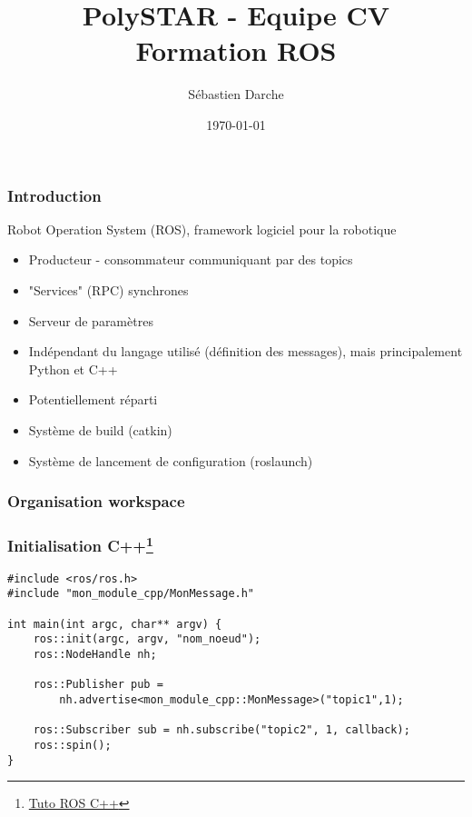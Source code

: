 \documentclass{beamer}
\title{PolySTAR - Equipe CV\\Formation ROS}
\author{Sébastien Darche}
\institute{PolySTAR - Polytechnique Montréal}
\date{\today}
\begin{document}
\frame{\titlepage}


\begin{frame}
\frametitle{Introduction}

Robot Operation System (ROS), framework logiciel pour la robotique

\begin{itemize}
    \item Producteur - consommateur communiquant par des topics
    \item "Services" (RPC) synchrones
    \item Serveur de paramètres
    \item Indépendant du langage utilisé (définition des messages), mais principalement Python et C++
    \item Potentiellement réparti
    \item Système de build (catkin)
    \item Système de lancement de configuration (roslaunch)
\end{itemize}

\end{frame}


\begin{frame}
\frametitle{Organisation workspace}
\footnotesize{
}
\end{frame}

\begin{frame}[fragile]
\frametitle{Initialisation
C++\footnote{\href{http://wiki.ros.org/ROS/Tutorials/WritingPublisherSubscriber\%28c\%2B\%2B\%29
}{Tuto ROS C++}}
}
\begin{verbatim}
#include <ros/ros.h>
#include "mon_module_cpp/MonMessage.h"

int main(int argc, char** argv) {
    ros::init(argc, argv, "nom_noeud");
    ros::NodeHandle nh;

    ros::Publisher pub = 
        nh.advertise<mon_module_cpp::MonMessage>("topic1",1);

    ros::Subscriber sub = nh.subscribe("topic2", 1, callback);
    ros::spin();
}
\end{verbatim}

\end{frame}
\end{document}
